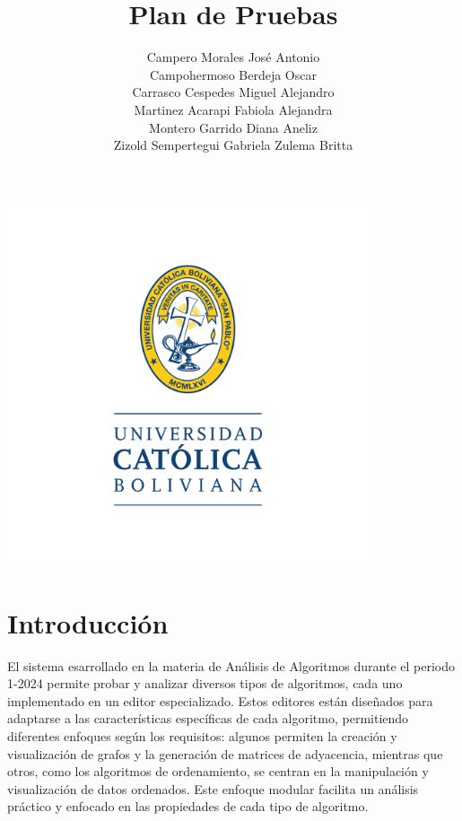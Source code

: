 \documentclass[stu, 12pt, letterpaper, donotrepeattitle, floatsintext, natbib]{apa7}
\title{\Large Plan de Pruebas}
\author{
    Campero Morales José Antonio \\
    Campohermoso Berdeja Oscar \\
    Carrasco Cespedes Miguel Alejandro \\
    Martinez Acarapi Fabiola Alejandra \\
    Montero Garrido Diana Aneliz \\
    Zizold Sempertegui Gabriela Zulema Britta
}
\affiliation{Universidad Católica Boliviana}
\begin{document}
\thispagestyle{empty}

\centering
\includegraphics[width=0.8\textwidth]{../imgs/logo-ucb.png} %
\vspace{-5cm} %

\maketitle

\newpage
{}
\renewcommand\contentsname{\large Índice}
\tableofcontents
\setcounter{tocdepth}{2}
\newpage
\renewcommand{\listfigurename}{\large Índice de figuras}
\listoffigures
\newpage
\renewcommand{\listtablename}{\large Índice de tablas}
\listoftables
\newpage

\section{\large Introducción}

\noindent El sistema esarrollado en la materia de Análisis de Algoritmos durante el periodo 1-2024 permite probar y analizar diversos tipos de algoritmos, cada uno implementado en un editor especializado. Estos editores están diseñados para adaptarse a las características específicas de cada algoritmo, permitiendo diferentes enfoques según los requisitos: algunos permiten la creación y visualización de grafos y la generación de matrices de adyacencia, mientras que otros, como los algoritmos de ordenamiento, se centran en la manipulación y visualización de datos ordenados. Este enfoque modular facilita un análisis práctico y enfocado en las propiedades de cada tipo de algoritmo.
\end{document}

